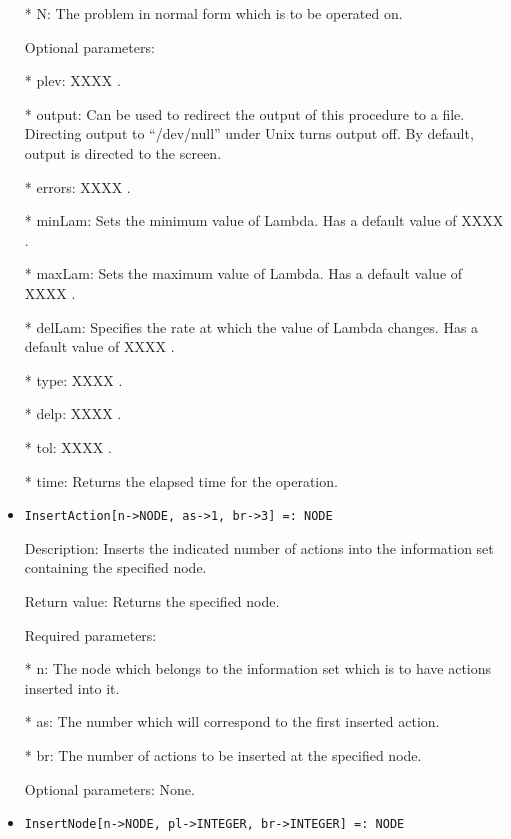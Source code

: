 \begin{itemize}
\bd
\item  
[* N:] The problem in normal form which is to be operated on.
\ed

\item
[Optional parameters:]\hfil\null

\bd
\item	
 [* plev:] XXXX .
\item
[* output:] Can be used to redirect the output of this procedure to a
file.  Directing output to ``/dev/null'' under Unix turns output off.
By default, output is directed to the screen.
\item
[* errors:] XXXX .
\item
[* minLam:] Sets the minimum value of Lambda.  Has a default value of
XXXX .
\item
[* maxLam:] Sets the maximum value of Lambda.  Has a default value of XXXX .
\item
[* delLam:] Specifies the rate at which the value of Lambda changes.
Has a default value of XXXX .
\item
[* type:] XXXX .
\item
[* delp:] XXXX .
\item
[* tol:] XXXX .
\item
[* time:] Returns the elapsed time for the operation.
\ed
\ed

\item
\begin{verbatim}
InsertAction[n->NODE, as->1, br->3] =: NODE
\end{verbatim}

\bd
\item
[Description:] Inserts the indicated number of actions into the 
information set containing the specified node.
\item
[Return value:] Returns the specified node.
\item
[Required parameters:]\hfil\null

\bd
\item
[* n:] The node which belongs to the information set which is to have
actions inserted into it.
\item
[* as:] The number which will correspond to the first inserted action.
\item
[* br:] The number of actions to be inserted at the specified node.
\ed

\item
[Optional parameters:] None.
\ed

\item
\begin{verbatim}
InsertNode[n->NODE, pl->INTEGER, br->INTEGER] =: NODE
\end{verbatim}


\end{itemize}
